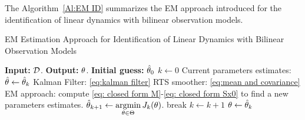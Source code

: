 
The Algorithm~\ref{Al:EM ID} summarizes the EM approach introduced for the identification of linear dynamics with bilinear observation models.
\begin{algorithm}[t]
    \caption{EM Estimation Approach for Identification of Linear Dynamics with Bilinear Observation Models}\label{Al:EM ID}
    \begin{algorithmic}
        \Statex \textbf{Input:} ${\mathcal{D}}$.
        \Statex \textbf{Output:} ${ \mathrm{\theta} }$.
        \State \textbf{Initial guess:} $\hat{{ \mathrm{\theta} }}_0$
        \State $k \gets 0$
            \State Current parameters estimates: $\hat{{ \mathrm{\theta} }} \gets \hat{{ \mathrm{\theta} }}_k$
               \State Kalman Filter: \eqref{eq:kalman filter}
            \EndFor
               \State RTS smoother: \eqref{eq:mean and covariance}
            \EndFor
            \State EM approach: compute \eqref{eq: closed form M}-\eqref{eq: closed form Sx0} to find a new parameters estimates. $\hat{\vctheta}_{k+1} \gets \argminOp_{\vctheta \in \Theta} J_k(\vctheta)$.
            \State break
            \Else
            \State $k \gets k+1$
            \EndIf
        \EndWhile
        \State ${ \mathrm{\theta} } \gets \hat{{ \mathrm{\theta} }}_k$
    \end{algorithmic}
    \label{alg_1}
\end{algorithm}



